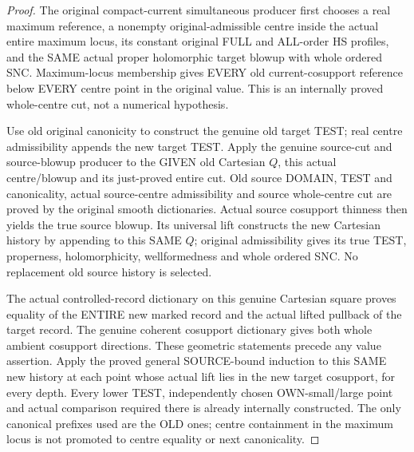 \begin{proof}
The original compact-current simultaneous producer first chooses a real
maximum reference, a nonempty original-admissible centre inside the actual
entire maximum locus, its constant original FULL and ALL-order HS profiles,
and the SAME actual proper holomorphic target blowup with whole ordered
SNC. Maximum-locus membership gives EVERY old current-cosupport reference
below EVERY centre point in the original value. This is an internally
proved whole-centre cut, not a numerical hypothesis.

Use old original canonicity to construct the genuine old target TEST;
real centre admissibility appends the new target TEST. Apply the genuine
source-cut and source-blowup producer to the GIVEN old Cartesian $Q$,
this actual centre/blowup and its just-proved entire cut. Old source
DOMAIN, TEST and canonicality, actual source-centre admissibility and
source whole-centre cut are proved by the original smooth dictionaries.
Actual source cosupport thinness then yields the true source blowup.
Its universal lift constructs the new Cartesian history by appending to
this SAME $Q$; original admissibility gives its true TEST, properness,
holomorphicity, wellformedness and whole ordered SNC. No replacement old
source history is selected.

The actual controlled-record dictionary on this genuine Cartesian square
proves equality of the ENTIRE new marked record and the actual lifted
pullback of the target record. The genuine coherent cosupport dictionary
gives both whole ambient cosupport directions. These geometric statements
precede any value assertion. Apply the proved general SOURCE-bound
induction to this SAME new history at each point whose actual lift lies
in the new target cosupport, for every depth. Every lower TEST, independently
chosen OWN-small/large point and actual comparison required there is
already internally constructed. The only canonical prefixes used are the
OLD ones; centre containment in the maximum locus is not promoted to
centre equality or next canonicality.
\end{proof}

